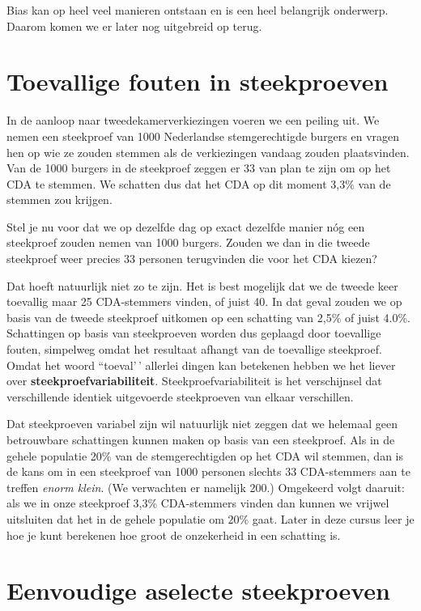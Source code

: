 \documentclass[
  a4paper,
]{scrbook}
\theoremstyle{definition}
\theoremstyle{definition}
\theoremstyle{remark}
\begin{document}
Bias kan op heel veel manieren ontstaan en is een heel belangrijk
onderwerp. Daarom komen we er later nog uitgebreid op terug.

\section{Toevallige fouten in
steekproeven}\label{toevallige-fouten-in-steekproeven}

In de aanloop naar tweedekamerverkiezingen voeren we een peiling uit. We
nemen een steekproef van 1000 Nederlandse stemgerechtigde burgers en
vragen hen op wie ze zouden stemmen als de verkiezingen vandaag zouden
plaatsvinden. Van de 1000 burgers in de steekproef zeggen er 33 van plan
te zijn om op het CDA te stemmen. We schatten dus dat het CDA op dit
moment 3,3\% van de stemmen zou krijgen.

Stel je nu voor dat we op dezelfde dag op exact dezelfde manier nóg een
steekproef zouden nemen van 1000 burgers. Zouden we dan in die tweede
steekproef weer precies 33 personen terugvinden die voor het CDA kiezen?

Dat hoeft natuurlijk niet zo te zijn. Het is best mogelijk dat we de
tweede keer toevallig maar 25 CDA-stemmers vinden, of juist 40. In dat
geval zouden we op basis van de tweede steekproef uitkomen op een
schatting van 2,5\% of juist 4.0\%. Schattingen op basis van
steekproeven worden dus geplaagd door toevallige fouten, simpelweg omdat
het resultaat afhangt van de toevallige steekproef. Omdat het woord
``toeval'\,' allerlei dingen kan betekenen hebben we het liever over
\textbf{steekproefvariabiliteit}. Steekproefvariabiliteit is het
verschijnsel dat verschillende identiek uitgevoerde steekproeven van
elkaar verschillen.

Dat steekproeven variabel zijn wil natuurlijk niet zeggen dat we
helemaal geen betrouwbare schattingen kunnen maken op basis van een
steekproef. Als in de gehele populatie 20\% van de stemgerechtigden op
het CDA wil stemmen, dan is de kans om in een steekproef van 1000
personen slechts 33 CDA-stemmers aan te treffen \emph{enorm klein}. (We
verwachten er namelijk 200.) Omgekeerd volgt daaruit: als we in onze
steekproef 3,3\% CDA-stemmers vinden dan kunnen we vrijwel uitsluiten
dat het in de gehele populatie om 20\% gaat. Later in deze cursus leer
je hoe je kunt berekenen hoe groot de onzekerheid in een schatting is.

\section{Eenvoudige aselecte
steekproeven}\label{eenvoudige-aselecte-steekproeven}
\end{document}
